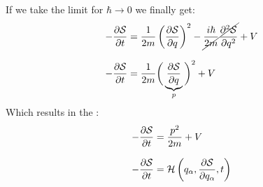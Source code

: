 If we take the limit for $\hbar \rightarrow 0$ we finally get:
\begin{equation}
  \begin{split}
    -\pdv{\action}{t} &= \dfrac{1}{2m}\brackets{\pdv{\action}{q}}^2  - \cancel{\dfrac{i\hbar}{2m}\pdv[2]{\action}{q}} + V\\[8pt]
    -\pdv{\action}{t} &= \dfrac{1}{2m}\bbrackets{\underbrace{\pdv{\action}{q}}_{p}}^2 + V
  \end{split}
\end{equation}
Which results in the \hamjacref :
\begin{equation}
  \begin{split}
    -\pdv{\action}{t} &= \dfrac{p^2}{2m} + V\\[8pt]
    -\pdv{\action}{t} &= \hamfun \brackets{q_{\alpha}, \pdv{\action}{q_{\alpha}},t}
  \end{split}
\end{equation}

